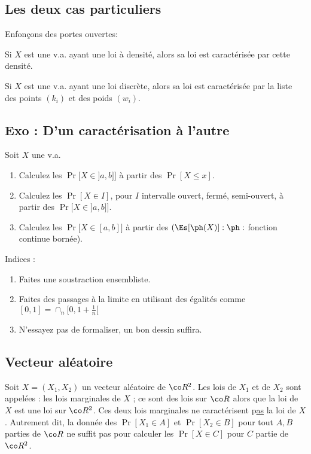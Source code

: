 \documentclass{article}
\begin{document}
\subsection{Les deux cas particuliers}

Enfonçons des portes ouvertes: 

Si $X$ est une v.a. ayant une loi à densité, alors sa loi est caractérisée par cette densité. 

Si $X$ est une v.a. ayant une loi discrète, alors sa loi est caractérisée par la liste des points  $(k_i)$  et  des poids $(w_i)$. 



\subsection{Exo : D'un  caractérisation à l'autre}


Soit $X$ une v.a. 
\begin{enumerate}
\item  Calculez les  $\Pr\Big[X\in ]a,b] \Big]$  à partir des  $\Pr[X \leq x]$. 
\item  Calculez les  $\Pr[X\in I ]$, pour $I$ intervalle ouvert, fermé, semi-ouvert, à partir des $\Pr\Big[X\in ]a,b] \Big]$.  
\item   Calculez les  $\Pr\Big[X\in [a,b] \Big]$ à partir des $(\Es[\ph(X)] : \ph : $ fonction continue bornée). 
\end{enumerate}

Indices : 
\begin{enumerate}
\item  Faites une soustraction ensembliste. 
\item  Faites des passages à la limite en utilisant des égalités comme $ [0,1] = \cap_n [0,1+\frac 1 n [   $ 
\item   N'essayez pas de formaliser, un bon dessin suffira. 
\end{enumerate}





\subsection{Vecteur aléatoire }


Soit $X=(X_1,X_2)$ un vecteur aléatoire de $\co R^2$.  Les lois de $X_1$ et de $X_2$ sont appelées : les lois marginales de $X$ ; ce sont des lois sur $\co R$ alors que la loi de $X$ est une loi sur $\co R^2$.
 Ces deux lois marginales ne caractérisent p\underline{as} la loi de $X$.    Autrement dit, la donnée des $\Pr[X_1 \in A]$ et   $\Pr[X_2 \in B]$  pour tout $A,B$ parties de $\co R$ ne suffit pas pour calculer les  $\Pr[X\in C]  $ pour $C$ partie de   $\co R^2$.  
\end{document}
